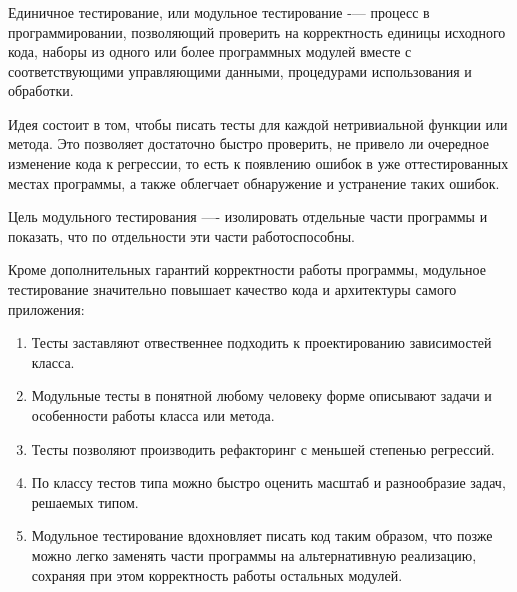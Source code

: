 \subsubsection{}
\label{sec:testing:unit:defenition}

Единичное тестирование, или модульное тестирование -— процесс в программировании, позволяющий проверить на корректность единицы исходного кода, наборы из одного или более программных модулей вместе с соответствующими управляющими данными, процедурами использования и обработки.

Идея состоит в том, чтобы писать тесты для каждой нетривиальной функции или метода. Это позволяет достаточно быстро проверить, не привело ли очередное изменение кода к регрессии, то есть к появлению ошибок в уже оттестированных местах программы, а также облегчает обнаружение и устранение таких ошибок. 

Цель модульного тестирования —- изолировать отдельные части программы и показать, что по отдельности эти части работоспособны. \cite{wiki:unit}

Кроме дополнительных гарантий корректности работы программы, модульное тестирование значительно повышает качество кода и архитектуры самого приложения:

\begin{enumerate}
	\item Тесты заставляют отвественнее подходить к проектированию зависимостей класса.
	\item Модульные тесты в понятной любому человеку форме описывают задачи и особенности работы класса или метода.
	\item Тесты позволяют производить рефакторинг с меньшей степенью регрессий.
	\item По классу тестов типа можно быстро оценить масштаб и разнообразие задач, решаемых типом.
	\item Модульное тестирование вдохновляет писать код таким образом, что позже можно легко заменять части программы на альтернативную реализацию, сохраняя при этом корректность работы остальных модулей.
\end{enumerate}
